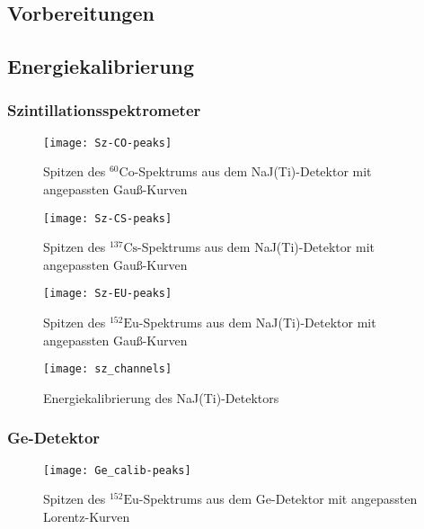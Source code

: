 \documentclass[11pt, ngerman, fleqn, DIV=15, headinclude, BCOR=2cm]{scrreprt}
\newcommand{\plotwidth}{0.8\linewidth}
\begin{document}
\begin{appendix}


\chapter{Vorbereitungen}
\section{Energiekalibrierung}\label{anhang-energie}

\subsection{Szintillationsspektrometer}
\begin{figure}[htbp]
    \centering
    \texttt{[image: Sz-CO-peaks]}
    \caption{%
	    Spitzen des $^{60}\text{Co}$-Spektrums aus dem NaJ(Ti)-Detektor
	    mit angepassten Gauß-Kurven
    }
    \label{fig:}
\end{figure}

\begin{figure}[htbp]
    \centering
    \texttt{[image: Sz-CS-peaks]}
    \caption{%
	    Spitzen des $^{137}\text{Cs}$-Spektrums aus dem NaJ(Ti)-Detektor
	    mit angepassten Gauß-Kurven
    }
    \label{fig:}
\end{figure}

\begin{figure}[htbp]
    \centering
    \texttt{[image: Sz-EU-peaks]}
    \caption{%
	    Spitzen des $^{152}\text{Eu}$-Spektrums aus dem NaJ(Ti)-Detektor
	    mit angepassten Gauß-Kurven
    }
    \label{fig:}
\end{figure}

\begin{figure}[htbp]
    \centering
    \texttt{[image: sz\_channels]}
    \caption{%
	    Energiekalibrierung des NaJ(Ti)-Detektors
    }
    \label{fig:sz_kanal}
\end{figure}

\clearpage
\subsection{Ge-Detektor}

\begin{figure}[htbp]
    \centering
    \texttt{[image: Ge\_calib-peaks]}
    \caption{%
	    Spitzen des $^{152}\text{Eu}$-Spektrums aus dem Ge-Detektor  mit
	    angepassten Lorentz-Kurven
    }
    \label{fig:Ge-peaks}
\end{figure}


\end{appendix}
\end{document}
